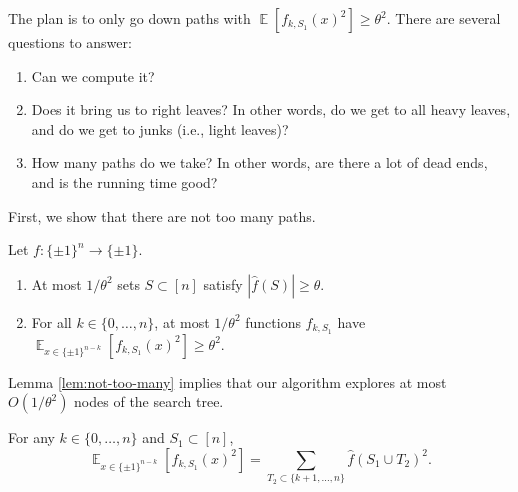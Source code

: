 \documentclass[letterpaper, reqno,11pt]{article}
\newcommand{\EE}{\mathop{{}\mathbb{E}}}
\begin{document}
The plan is to only go down paths with $\EE[f_{k, S_1}(x)^2] \geq \theta^2$. There are several questions to answer:
\begin{enumerate}[label=(\roman*), itemsep=0pt]
  \item Can we compute it?
  \item Does it bring us to right leaves? In other words, do we get to all heavy leaves, and do we get to junks (i.e., light leaves)?
  \item How many paths do we take? In other words, are there a lot of dead ends, and is the running time good?
\end{enumerate}

First, we show that there are not too many paths.

\begin{lemma} \label{lem:not-too-many}
  Let $f : \{ \pm 1 \}^n \to \{ \pm 1 \}$.
  \begin{enumerate}[label=(\roman*), itemsep=0pt]
    \item At most $1/\theta^2$ sets $S \subset [n]$ satisfy $|\hat{f}(S)| \geq \theta$.
    \item For all $k \in \{ 0, \ldots, n \}$, at most $1/\theta^2$ functions $f_{k, S_1}$ have $\EE_{x \in \{ \pm 1 \}^{n - k}}[f_{k, S_1}(x)^2] \geq \theta^2$.
  \end{enumerate}
\end{lemma}

Lemma \ref{lem:not-too-many} implies that our algorithm explores at most $O(1/\theta^2)$ nodes of the search tree.

\begin{proposition} \label{prop:level-parseval}
  For any $k \in \{ 0, \ldots, n \}$ and $S_1 \subset [n]$,
  $$ \EE_{x \in \{ \pm 1 \}^{n - k}} \left[f_{k, S_1}(x)^2\right] = \sum_{T_2 \subset \{ k + 1, \ldots, n \}} \hat{f}\left(S_1 \cup T_2\right)^2. $$
\end{proposition}
\end{document}
